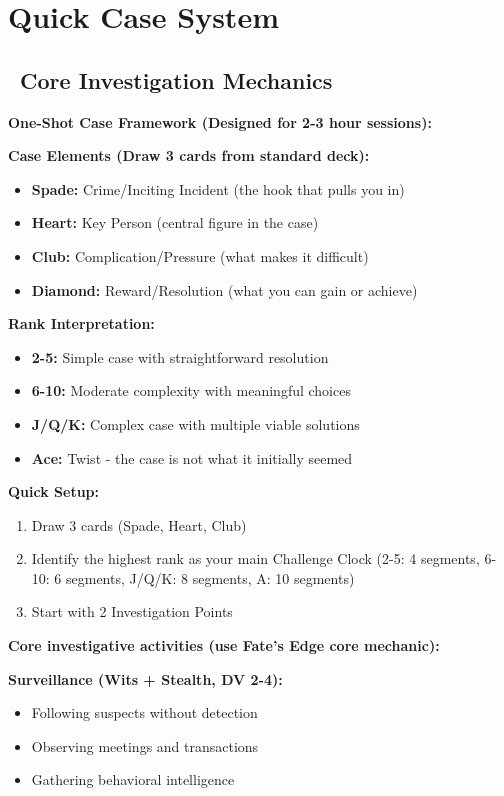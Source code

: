 \documentclass[11pt]{article}
\begin{document}
\newpage

\section{Quick Case System}

\subsection*{\faFolder\ Core Investigation Mechanics}

\textbf{One-Shot Case Framework (Designed for 2-3 hour sessions):}

\textbf{Case Elements (Draw 3 cards from standard deck):}
\begin{itemize}
    \item \textbf{Spade:} Crime/Inciting Incident (the hook that pulls you in)
    \item \textbf{Heart:} Key Person (central figure in the case)
    \item \textbf{Club:} Complication/Pressure (what makes it difficult)
    \item \textbf{Diamond:} Reward/Resolution (what you can gain or achieve)
\end{itemize}

\textbf{Rank Interpretation:}
\begin{itemize}
    \item \textbf{2-5:} Simple case with straightforward resolution
    \item \textbf{6-10:} Moderate complexity with meaningful choices
    \item \textbf{J/Q/K:} Complex case with multiple viable solutions
    \item \textbf{Ace:} Twist - the case is not what it initially seemed
\end{itemize}

\textbf{Quick Setup:}
\begin{enumerate}
    \item Draw 3 cards (Spade, Heart, Club)
    \item Identify the highest rank as your main Challenge Clock (2-5: 4 segments, 6-10: 6 segments, J/Q/K: 8 segments, A: 10 segments)
    \item Start with 2 Investigation Points
\end{enumerate}

\textbf{Core investigative activities (use Fate's Edge core mechanic):}

\textbf{Surveillance (Wits + Stealth, DV 2-4):}
\begin{itemize}
    \item Following suspects without detection
    \item Observing meetings and transactions
    \item Gathering behavioral intelligence
\end{itemize}
\end{document}
